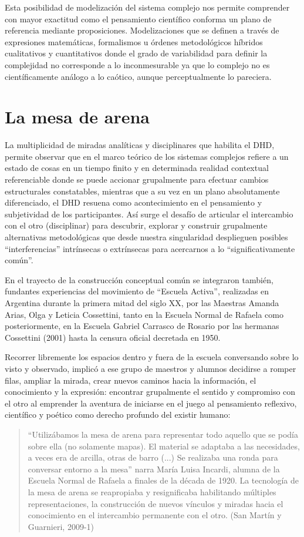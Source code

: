 Esta posibilidad de modelización del sistema complejo nos permite
comprender con mayor exactitud como el pensamiento científico conforma
un plano de referencia mediante proposiciones. Modelizaciones que se
definen a través de expresiones matemáticas, formalismos u órdenes
metodológicos híbridos cualitativos y cuantitativos donde el grado de
variabilidad  para definir la  complejidad  no  corresponde   a   lo
inconmesurable ya que lo complejo no es científicamente análogo a lo
caótico, aunque perceptualmente lo pareciera.


\section{La mesa de arena}

La multiplicidad de miradas analíticas y disciplinares que habilita el
DHD, permite observar que en el marco teórico de los sistemas complejos
refiere a un estado de cosas en un tiempo finito y en determinada realidad
contextual referenciable donde se puede accionar grupalmente para
efectuar cambios estructurales constatables, mientras que a su vez en un
plano absolutamente diferenciado, el DHD resuena como acontecimiento
en el pensamiento y subjetividad de los participantes. Así surge el desafío
de articular el intercambio con el otro (disciplinar) para descubrir, explorar
y construir grupalmente alternativas metodológicas que desde nuestra
singularidad desplieguen posibles “interferencias” intrínsecas o extrínsecas
para acercarnos a lo “significativamente común”.

En el trayecto de la construcción conceptual común se integraron
también, fundantes experiencias del movimiento de “Escuela Activa”,
realizadas en Argentina durante la primera mitad del siglo XX, por las
Maestras Amanda Arias, Olga y Leticia Cossettini, tanto en la Escuela
Normal de Rafaela como posteriormente, en la Escuela Gabriel Carrasco de
Rosario por las hermanas Cossettini (2001) hasta la censura oficial
decretada en 1950.

Recorrer libremente los espacios dentro y fuera de la escuela conversando sobre
lo visto y observado, implicó a ese grupo de maestros y alumnos decidirse a
romper filas, ampliar la mirada, crear nuevos caminos hacia  la información, el 
conocimiento y la   expresión:  encontrar grupalmente el sentido y compromiso
con el otro al emprender la aventura de iniciarse en el juego al pensamiento
reflexivo, científico y poético como derecho profundo del existir humano:


\begin{quote}
“Utilizábamos la mesa de arena para representar todo aquello que se
podía sobre ella (no solamente mapas). El material se adaptaba a las
necesidades, a veces era de arcilla, otras de barro (...) Se realizaba una ronda
para conversar entorno a la mesa” narra María Luisa Incardi, alumna de la
Escuela Normal de Rafaela a finales de la década de 1920. La tecnología de la
mesa de arena se reapropiaba y resignificaba habilitando
múltiples representaciones, la construcción de nuevos vínculos y miradas hacia
el conocimiento en el intercambio permanente con el otro. (San Martín
y Guarnieri, 2009-1)
\end{quote}

